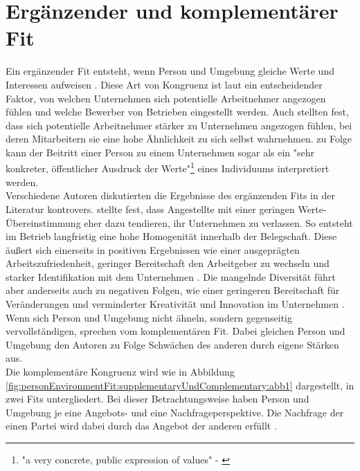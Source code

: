 \section{Ergänzender und komplementärer Fit}
\label{ch:personEnvironmentFit:supplementaryUndComplementary}
Ein ergänzender Fit entsteht, wenn Person und Umgebung gleiche Werte und Interessen aufweisen \cite[S. 2f.]{muchinsky:1987}. Diese Art von Kongruenz ist laut \textcite[S. 1ff.]{schneider:1987} ein entscheidender Faktor, von welchen Unternehmen sich potentielle Arbeitnehmer angezogen fühlen und welche Bewerber von Betrieben eingestellt werden. Auch \textcite[S. 7]{devendorf:2008} stellten fest, dass sich potentielle Arbeitnehmer stärker zu Unternehmen angezogen fühlen, bei deren Mitarbeitern sie eine hohe Ähnlichkeit zu sich selbst wahrnehmen. \textcite[S. 4, Z. 25f.]{popovich:1982} zu Folge kann der Beitritt einer Person zu einem Unternehmen sogar als ein "sehr konkreter, öffentlicher Ausdruck der Werte"\footnote{"a very concrete, public expression of values" - \textcite[S. 4, Z. 25f.]{popovich:1982}} eines Individuums interpretiert werden.\\
Verschiedene Autoren diskutierten die Ergebnisse des ergänzenden Fits in der Literatur kontrovers. \textcite[S. 6]{schneider:1987} stellte fest, dass Angestellte mit einer geringen Werte-Übereinstimmung eher dazu tendieren, ihr Unternehmen zu verlassen. So entsteht im Betrieb langfristig eine hohe Homogenität innerhalb der Belegschaft. Diese äußert sich einerseits in positiven Ergebnissen wie einer ausgeprägten Arbeitszufriedenheit, geringer Bereitschaft den Arbeitgeber zu wechseln und starker Identifikation mit dem Unternehmen \cite[S. 25ff.]{kristof:1996}\cite[S. 5]{su:2015}. Die mangelnde Diversität führt aber anderseits auch zu negativen Folgen, wie einer geringeren Bereitschaft für Veränderungen \cite[S. 10]{schneider:1987} und verminderter Kreativität und Innovation im Unternehmen \cite[S. 7]{chatman:1998}.\\
Wenn sich Person und Umgebung nicht ähneln, sondern gegenseitig vervollständigen, sprechen \textcite[S. 4]{muchinsky:1987} vom komplementären Fit. Dabei gleichen Person und Umgebung den Autoren zu Folge Schwächen des anderen durch eigene Stärken aus.\\
Die komplementäre Kongruenz wird wie in Abbildung \ref{fig:personEnvironmentFit:supplementaryUndComplementary:abb1} dargestellt, in zwei Fits untergliedert. Bei dieser Betrachtungsweise haben Person und Umgebung je eine Angebots- und eine Nachfrageperspektive. Die Nachfrage der einen Partei wird dabei durch das Angebot der anderen erfüllt \cite[S. 2ff.]{caplan:1987}\cite[S. 2f.]{edwards:1991}.\\
